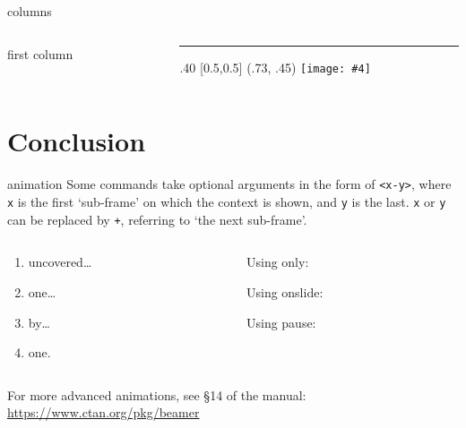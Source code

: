\documentclass[aspectratio=43]{beamer}
\makeatletter
\newcommand{\absimage}[4][0.5,0.5]{%
	\begin{textblock}{#3}%
		[#1]%
		(#2)%
		\texttt{[image: \#4]}%
\end{textblock}}
\newcommand{\mininomen}[2][1]{{\let\thefootnote\relax%
	\footnotetext{\begin{tabular}{*{#1}{@{\!}>{\centering\arraybackslash}p{1em}@{\;}p{\textwidth/#1-2em}}}%
	#2\end{tabular}}}}
\makeatother
\begin{document}
	

\begin{frame}{columns}
  \begin{columns}[onlytextwidth]
    \begin{column}{.5\textwidth}
      first column
    \end{column}
    \begin{column}{.5\textwidth}
      \textcolor{tudCyan}{\rule{1\columnwidth}{1\columnwidth}}
      \absimage{.73, .45}{.40}{imgs/logo-ugr.pdf}
    \end{column}
  \end{columns}
\end{frame}

\section{Conclusion}
\begin{frame}[fragile]{animation}
  \vfill
  Some commands take optional arguments in the form of \verb|<x-y>|,
  where \verb|x| is the first `sub-frame' on which the context is shown,
  and \verb|y| is the last. \verb|x| or \verb|y| can be replaced by \verb|+|,
  referring to `the next sub-frame'. 
  \vfill
  \begin{columns}[onlytextwidth]
  \begin{column}{.5\textwidth}
    \begin{enumerate}
      \item<+-> uncovered\ldots
      \item<+-> one\ldots
      \item<+-> by\ldots
      \item<+-> one.
    \end{enumerate}
    \end{column}
  \begin{column}{.5\textwidth}
      Using only:

      Using onslide:

      Using pause:
  \end{column}
  \end{columns}
  \vfill
  For more advanced animations, see \S 14 of the manual:\\
  \url{https://www.ctan.org/pkg/beamer}
  \vfill
\end{frame}
\end{document}
